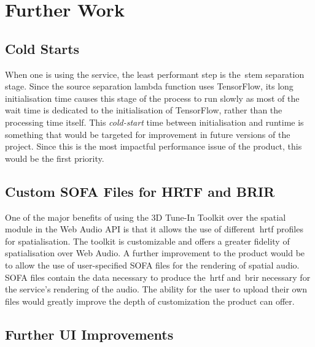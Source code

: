 \thispagestyle{plain}
\newpage
\section{Further Work}\label{sec:further-work}

\normalsize

\subsection{Cold Starts}\label{subsec:cold-starts}

When one is using the service, the least performant step is the~\gls{stem} separation stage.
Since the source separation lambda function uses TensorFlow,
its long initialisation time causes this stage of the process
to run slowly as most of the wait time is dedicated to the initialisation of TensorFlow,
rather than the processing time itself.
This \textit{cold-start}
time between initialisation and runtime is something
that would be targeted for improvement in future versions of the project.
Since this is the most impactful performance issue of the product, this would be the first priority.

\subsection{Custom SOFA Files for HRTF and BRIR}\label{subsec:custom-hrtf-and-hrir-files}

One of the major benefits
of using the 3D Tune-In Toolkit over the spatial module in the Web Audio API is that it allows the use of different~\gls{hrtf} profiles for spatialisation.
The toolkit is customizable and offers a greater fidelity of spatialisation over Web Audio.
A further improvement to the product would be
to allow the use of user-specified SOFA files for the rendering of spatial audio.
SOFA files contain the data necessary to produce the~\gls{hrtf} and~\gls{brir} necessary for the service's rendering of the audio.
The ability
for the user to upload their own files would greatly improve the depth of customization the product can offer.

\subsection{Further UI Improvements}\label{subsec:ui-improvements}

